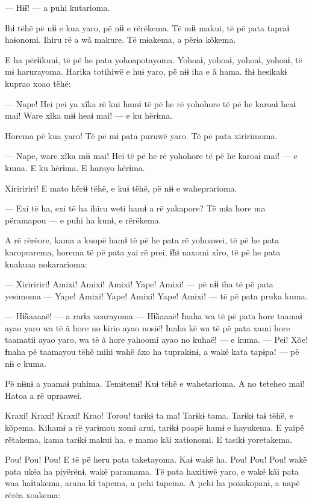 --- Hɨ̃ɨ! --- a puhi kutarioma. 

Ɨhɨ tëhë pë nɨɨ e kua yaro, pë nɨɨ e rërëkema. Të mɨɨ makui, të pë pata
tapraɨ haɨonomi. Ihiru rë a wã makure. Të mɨakema, a përɨa kõkema. 

E ha përɨikunɨ, të pë he pata yohoapotayoma. Yohoaɨ, yohoaɨ, yohoaɨ,
yohoaɨ, të mɨ harurayoma. Harika totihiwë e huɨ yaro, pë nɨɨ iha e ã
hama. Ɨhɨ hesikakɨ kuprao xoao tëhë:

--- Nape! Hei pei ya xĩka rë kui hamɨ të pë he rë yohohore të pë he
karoaɨ heaɨ mai! Ware xĩka mɨɨ heaɨ mai! --- e ku hërɨma. 

Horema pë kua yaro! Të pë mɨ pata puruwë yaro. Të pë pata xiririmoma. 

--- Nape, ware xĩka mɨɨ mai! Hei të pë he rë yohohore të pë he karoaɨ
mai! --- e kuma. E ku hërɨma. E harayo hërɨma. 

Xiriririri! E mato hërɨɨ tëhë, e kuɨ tëhë, pë nɨɨ e waheprarioma. 

--- Exi të ha, exi të ha ihiru weti hamɨ a rë yakapore? Të mɨa hore ma
përamapou --- e puhi ha kunɨ, e rërëkema. 

A rë rërëore, kama a kuopë hamɨ të pë he pata rë yohoawei, të pë he pata
karoprarema, horema të pë pata yai rë prei, ɨ̃hɨ naxomi xĩro, të pë he
pata kuakuaa nokararioma:

--- Xiriririri! Amixi! Amixi! Amixi! Yape! Amixi! --- pë nɨɨ iha të pë
pata yesimoma --- Yape! Amixi! Yape! Amixi! Yape! Amixi! --- të pë pata
pruka kuma. 

--- Hɨ̃ãaaaaë! --- a rarɨa xoarayoma --- Hɨ̃ãaaaë! Ɨnaha wa të pë pata
hore taamaɨ ayao yaro wa të ã hore no kirio ayao nosië! Ɨnaha kë wa të
pë pata xami hore taamatii ayao yaro, wa të ã hore yahoomi ayao no
kuhaë! --- e kuma. --- Pei! Xõe! Ɨnaha pë taamayou tëhë mihi wahë ãxo ha
tuprakɨnɨ, a wakë kata tapɨpa! --- pë nɨɨ e kuma. 

Pë nɨɨnɨ a yaamaɨ puhima. Temɨtemɨ! Kuɨ tëhë e wahetarioma. A no teteheo
mai! Hatoa a rë upraawei. 

Kraxi! Kraxi! Kraxi! Krao! Torou! tarɨkɨ ta ma! Tarɨkɨ tama. Tarɨkɨ taɨ
tëhë, e kõpema. Kihamɨ a rë yarɨmou xomi arui, tarɨkɨ poapë hamɨ e
hayukema. E yaipë rëtakema, kama tarɨkɨ makui ha, e mamo kãi xationomi.
E tasikɨ yoretakema. 

Pou! Pou! Pou! E të pë heru pata taketayoma. Kaɨ wakë ha. Pou! Pou! Pou!
wakë pata ukëa ha piyërënɨ, wakë paramama. Të pata haxitiwë yaro, e wakë
kãi pata waa haɨtakema, arana kɨ tapema, a pehi tapema. A pehi ha
poxokopanɨ, a napë rërëa xoakema:

